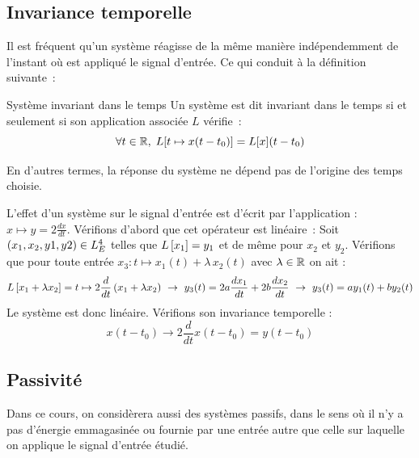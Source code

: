 	
	\subsection{Invariance temporelle}
	Il est fréquent qu'un système réagisse de la même manière indépendemment de l'instant où est appliqué le signal d'entrée. Ce qui conduit à la définition suivante~: 
	\begin{definition}{Système invariant dans le temps}
	Un système est dit invariant dans le temps si et seulement si son application associée $L$ vérifie~:
	\begin{equation}
	\forall t\in \mathbb{R}, \; L[t\mapsto x(t-t_{0})] = L[x](t-t_{0}) 
	\end{equation}
	\end{definition}
	
	En d'autres termes, la réponse du système ne dépend pas de l'origine des temps choisie.
	
	\begin{example}
	L'effet d'un système sur le signal d'entrée est d'écrit par l'application : $x \mapsto y=2\frac{dx}{dt}$.
	Vérifions d'abord que cet opérateur est linéaire~:
	Soit $ \left(x_1,x_2,y1,y2\right)\in L_E^4$ telles que $L\left[x_1\right]=y_1$ et de même pour $x_2$ et $y_2$. Vérifions que pour toute entrée $x_{3} : t\mapsto x_{1}(t)+\lambda\,x_{2}(t) $ avec $\lambda\in\mathbb{R}$ on ait  :
	\begin{eqnarray*}
	L\left[x_1+\lambda x_2\right] = t \mapsto 2\frac{d}{dt}\left(x_1+\lambda x_2\right)~\rightarrow~
	y_{3}(t)=2a\frac{dx_{1}}{dt}+2b\frac{dx_{2}}{dt}~\rightarrow~
	y_{3}(t)=ay_{1}(t)+by_{2}(t)
	\end{eqnarray*}
	Le système est donc linéaire. Vérifions son invariance temporelle :
	\begin{equation*}
	x(t-t_{0}) \rightarrow 2\frac{d}{dt}x(t-t_{0})=y(t-t_{0})
	\end{equation*}
	\end{example}
	
	
	\subsection{Passivité}
	Dans ce cours, on considèrera aussi des systèmes passifs, dans le sens où il n'y a pas d'énergie emmagasinée ou fournie par une entrée autre que celle sur laquelle on applique le signal d'entrée étudié.
